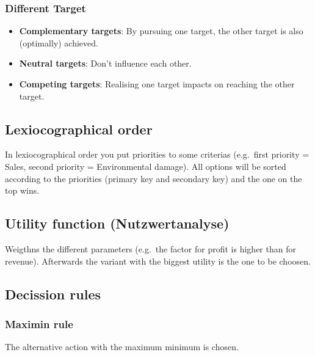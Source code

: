 \hypertarget{different-target}{%
\subsubsection{Different Target}\label{different-target}}

\begin{itemize}
\tightlist
\item
  \textbf{Complementary targets}: By pursuing one target, the other
  target is also (optimally) achieved.
\item
  \textbf{Neutral targets}: Don't influence each other.
\item
  \textbf{Competing targets}: Realising one target impacts on reaching
  the other target.
\end{itemize}

\hypertarget{lexiocographical-order}{%
\subsection{Lexiocographical order}\label{lexiocographical-order}}

In lexiocographical order you put priorities to some criterias
(e.g.~first priority = Sales, second priority = Environmental damage).
All options will be sorted according to the priorities (primary key and
secondary key) and the one on the top wins.

\hypertarget{utility-function-nutzwertanalyse}{%
\subsection{Utility function
(Nutzwertanalyse)}\label{utility-function-nutzwertanalyse}}

Weigthns the different parameters (e.g.~the factor for profit is higher
than for revenue). Afterwards the variant with the biggest utility is
the one to be choosen.

\hypertarget{decission-rules}{%
\subsection{Decission rules}\label{decission-rules}}

\hypertarget{maximin-rule}{%
\subsubsection{Maximin rule}\label{maximin-rule}}

The alternative action with the maximum minimum is chosen.


